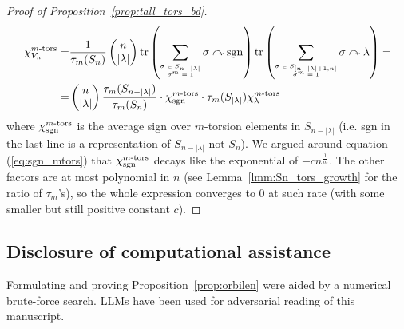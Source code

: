 \documentclass{amsart}
\newcommand{\tn}{\textnormal}
\newcommand{\tr}{\operatorname{tr}}
\begin{document}
\begin{proof}[Proof of Proposition~\ref{prop:tall_tors_bd}]
\begin{align*}
\chi_{V_n}^{m\tn{-tors}}=&\frac{1}{\tau_m(S_n)}\begin{pmatrix}n\\|\lambda|\end{pmatrix}\tr\left(\sum_{\tiny\begin{matrix}\sigma\in S_{n-|\lambda|}\\\sigma^m=1\end{matrix}}\sigma\curvearrowright\tn{sgn}\right)\tr\left(\sum_{\tiny\begin{matrix}\sigma\in S_{[n-|\lambda|+1,n]}\\\sigma^m=1\end{matrix}}\sigma\curvearrowright\lambda\right)=\\
=&\begin{pmatrix}n\\|\lambda|\end{pmatrix}\frac{\tau_m(S_{n-|\lambda|})}{\tau_m(S_n)}\cdot\chi_\tn{sgn}^{m\tn{-tors}}\cdot\tau_m(S_{|\lambda|})\chi_\lambda^{m\tn{-tors}}
\end{align*}
where $\chi_\tn{sgn}^{m\tn{-tors}}$ is the average sign over $m$-torsion elements in $S_{n-|\lambda|}$ (i.e. sgn in the last line is a representation of $S_{n-|\lambda|}$ not $S_n$). We argued around equation (\ref{eq:sgn_mtors}) that $\chi^{m\tn{-tors}}_\tn{sgn}$ decays like the exponential of $-cn^{\frac{1}{m}}$. The other factors are at most polynomial in $n$ (see Lemma~\ref{lmm:Sn_tors_growth} for the ratio of $\tau_m$'s), so the whole expression converges to 0 at such rate (with some smaller but still positive constant $c$).
\end{proof}

\subsection*{Disclosure of computational assistance}

Formulating and proving Proposition~\ref{prop:orbilen} were aided by a numerical brute-force search. LLMs have been used for adversarial reading of this manuscript.

\printbibliography
\end{document}

